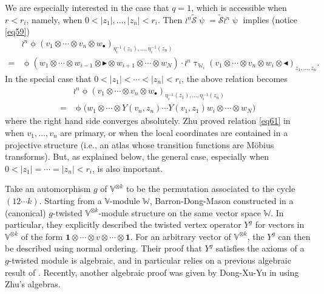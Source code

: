 \documentclass[12pt,a4paper,notitlepage]{article}
\theoremstyle{definition}
\theoremstyle{plain}
\newcommand{\mc}{\mathcal}
\newcommand{\wtd}{\widetilde}
\newcommand{\id}{\mathbf{1}}
\newcommand{\blt}{\bullet}
\newcommand{\Vbb}{\mathbb V}
\newcommand{\Wbb}{\mathbb W}
\newcommand{\btl}{\blacktriangleleft}
\newcommand{\btr}{\blacktriangleright}
\numberwithin{equation}{section}
\begin{document}
We are especially interested in the case that $q=1$, which is accessible when $r<r_i$, namely, when $0<|z_1|,\dots,|z_n|<r_i$. Then $\wr^n\wtd{\mc S}\uppsi=\wtd{\mc S}\wr^n\uppsi$ implies (notice \eqref{eq59})
\begin{align}
&\wr^n\upphi(v_1\otimes\cdots\otimes v_n\otimes w_\blt)_{\eta_i^{-1}(z_1),\dots,\eta_i^{-1}(z_n)}\nonumber\\
=&\upphi(w_1\otimes\cdots\otimes w_{i-1} \otimes \btr\otimes w_{i+1}\otimes\cdots\otimes w_N)\cdot\wr^n\uptau_{\Wbb_i}(v_1\otimes\cdots\otimes v_n\otimes w_i\otimes\btl)_{z_1,\dots,z_n}.\label{eq60}
\end{align}
In the special case that $0<|z_1|<\cdots<|z_n|<r_i$, the above relation becomes
\begin{align}
&\wr^n\upphi(v_1\otimes\cdots\otimes v_n\otimes w_\blt)_{\eta_i^{-1}(z_1),\dots,\eta_i^{-1}(z_n)}\nonumber\\
=&\upphi\big(w_1\otimes\cdots\otimes Y(v_n,z_n)\cdots Y(v_1,z_1)w_i\otimes\cdots\otimes w_N\big)\label{eq61}	
\end{align}
where the right hand side converges absolutely. Zhu proved relation \eqref{eq61} in \cite[Thm. 6.2]{Zhu94} when $v_1,\dots,v_n$ are primary, or when the local coordinates are contained in a projective structure (i.e., an atlas whose transition functions are M\"obius transforms). But, as explained below, the general case, especially when $0<|z_1|=\cdots=|z_n|<r_i$, is also important.

Take an automorphism $g$ of $\Vbb^{\otimes k}$ to be the permutation associated to the cycle $(12\cdots k)$. Starting from a $\Vbb$-module $\Wbb$, Barron-Dong-Mason constructed in \cite{BDM02} a (canonical) $g$-twisted $\Vbb^{\otimes k}$-module structure on the same vector space $\Wbb$. In particular, they explicitly described the twisted vertex operator $Y^g$ for vectors in $\Vbb^{\otimes k}$ of the form $\id\otimes\cdots\otimes v\otimes\cdots\otimes\id$. For an arbitrary vector of $\Vbb^{\otimes k}$, the $Y^g$  can then be described using normal ordering. Their proof that $Y^g$ satisfies the axioms of a $g$-twisted module is algebraic, and in particular relies on a previous algebraic result of \cite{Li96}. Recently, another algebraic proof was given by Dong-Xu-Yu in \cite{DXY21} using Zhu's algebras.
\end{document}
